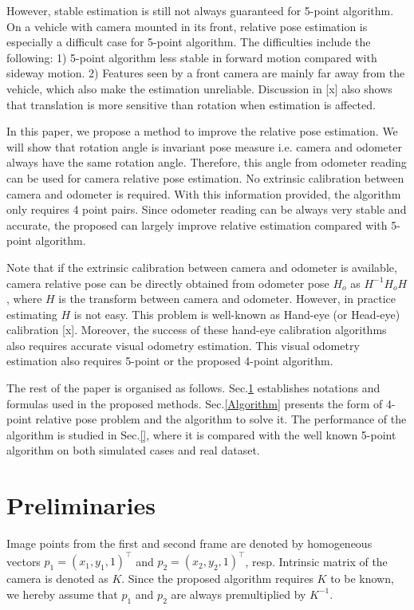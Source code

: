 \documentclass{article}
\begin{document}
However, stable estimation is still not always guaranteed for 5-point algorithm. On a vehicle with camera mounted in its front, relative pose estimation is especially a difficult case for 5-point algorithm. The difficulties include the following: 1) 5-point algorithm less stable in forward motion compared with sideway motion. 2) Features seen by a front camera are mainly far away from the vehicle, which also make the estimation unreliable. Discussion in [x] also shows that translation is more sensitive than rotation when estimation is affected. 

In this paper, we propose a method to improve the relative pose estimation. We will show that rotation angle is invariant pose measure i.e. camera and odometer always have the same rotation angle. Therefore, this angle from odometer reading can be used for camera relative pose estimation. No extrinsic calibration between camera and odometer is required. With this information provided, the algorithm only requires 4 point pairs. Since odometer reading can be always very stable and accurate, the proposed can largely improve relative estimation compared with 5-point algorithm. 

Note that if the extrinsic calibration between camera and odometer is available, camera relative pose can be directly obtained from odometer pose $H_o$ as $H^{-1} H_o H$, where $H$ is the transform between camera and odometer. However, in practice estimating $H$ is not easy. This problem is well-known as Hand-eye (or Head-eye) calibration [x]. Moreover, the success of these hand-eye calibration algorithms also requires accurate visual odometry estimation. This visual odometry estimation also requires 5-point or the proposed 4-point algorithm. 

The rest of the paper is organised as follows. Sec.\ref{Preliminaries} establishes notations and formulas used in the proposed methods. Sec.\ref{Algorithm} presents the form of 4-point relative pose problem and the algorithm to solve it. The performance of the algorithm is studied in Sec.\ref{}, where it is compared with the well known 5-point algorithm on both simulated cases and real dataset. 

\section{Preliminaries}
\label{Preliminaries}

Image points from the first and second frame are denoted by homogeneous vectors $p_1 = (x_1, y_1, 1)^\top$ and $p_2 = (x_2, y_2, 1)^\top$, resp. Intrinsic matrix of the camera is denoted as $K$. Since the proposed algorithm requires $K$ to be known, we hereby assume that $p_1$ and $p_2$ are always premultiplied by $K^{-1}$. 
\end{document}
